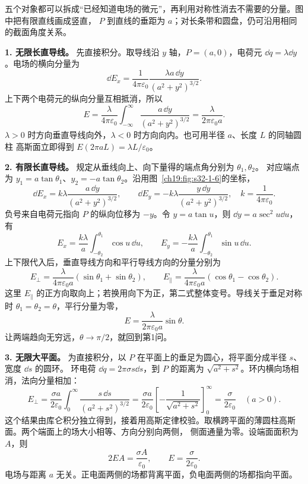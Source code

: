 \begin{xesolution}
五个对象都可以拆成“已经知道电场的微元”，再利用对称性消去不需要的分量。图中把有限直线画成竖直，
$P$ 到直线的垂距为 $a$；对长条带和圆盘，仍可沿用相同的截面角度关系。

\par\noindent\begin{minipage}{\linewidth}
\extendedChargeFigure
{}\label{ch19:fig:s32-1-6}
\end{minipage}\par\medskip

\textbf{1. 无限长直导线。} 先直接积分。取导线沿 $y$ 轴，$P=(a,0)$，电荷元
$\dd q=\lambda\dd y$。电场的横向分量为
\[
  \dd E_x=\frac{1}{4\pi\varepsilon_0}
  \frac{\lambda a\,\dd y}{(a^2+y^2)^{3/2}}.
\]
上下两个电荷元的纵向分量互相抵消，所以
\[
  E=\frac{\lambda}{4\pi\varepsilon_0}
  \int_{-\infty}^{\infty}\frac{a\,\dd y}{(a^2+y^2)^{3/2}}
  =\boxed{\frac{\lambda}{2\pi\varepsilon_0a}}.
\]
$\lambda>0$ 时方向垂直导线向外，$\lambda<0$ 时方向向内。也可用半径 $a$、长度 $L$ 的同轴圆柱
高斯面立即得到 $E(2\pi aL)=\lambda L/\varepsilon_0$。

\textbf{2. 有限长直导线。} 规定从垂线向上、向下量得的端点角分别为 $\theta_1,\theta_2$。
对应端点为 $y_1=a\tan\theta_1$、$y_2=-a\tan\theta_2$。沿用图~\ref{ch19:fig:s32-1-6}的坐标，
\[
 \dd E_x=k\lambda\frac{a\,\dd y}{(a^2+y^2)^{3/2}},\qquad
 \dd E_y=-k\lambda\frac{y\,\dd y}{(a^2+y^2)^{3/2}},\quad k=\frac1{4\pi\varepsilon_0}.
\]
负号来自电荷元指向 $P$ 的纵向位移为 $-y$。令 $y=a\tan u$，则 $\dd y=a\sec^2u\dd u$，有
\[
 E_x=\frac{k\lambda}{a}\int_{-\theta_2}^{\theta_1}\cos u\,\dd u,
 \qquad E_y=-\frac{k\lambda}{a}\int_{-\theta_2}^{\theta_1}\sin u\,\dd u.
\]
上下限代入后，垂直导线方向和平行导线方向的分量分别为
\[
  \boxed{E_\perp=\frac{\lambda}{4\pi\varepsilon_0a}
  (\sin\theta_1+\sin\theta_2)},
  \qquad
  \boxed{E_\parallel=\frac{\lambda}{4\pi\varepsilon_0a}
  (\cos\theta_1-\cos\theta_2)}.
\]
这里 $E_\parallel$ 的正方向取向上；若换用向下为正，第二式整体变号。导线关于垂足对称时
$\theta_1=\theta_2=\theta$，平行分量为零，
\[
  \boxed{E=\frac{\lambda}{2\pi\varepsilon_0a}\sin\theta}.
\]
让两端趋向无穷远，$\theta\to\pi/2$，就回到第1问。

\textbf{3. 无限大平面。} 为直接积分，以 $P$ 在平面上的垂足为圆心，将平面分成半径 $s$、宽度 $\dd s$ 的圆环。
环电荷 $\dd q=2\pi\sigma s\dd s$，到 $P$ 的距离为 $\sqrt{a^2+s^2}$。环内横向场相消，法向分量相加：
\[
 E_\perp=\frac{\sigma a}{2\varepsilon_0}\int_0^\infty
 \frac{s\,\dd s}{(a^2+s^2)^{3/2}}
 =\frac{\sigma a}{2\varepsilon_0}
 \left[-\frac1{\sqrt{a^2+s^2}}\right]_0^\infty
 =\frac{\sigma}{2\varepsilon_0}\quad(a>0).
\]
这个结果由库仑积分独立得到，接着用高斯定律校验。取横跨平面的薄圆柱高斯面。两个端面上的场大小相等、方向分别向两侧，
侧面通量为零。设端面面积为 $A$，则
\[
  2EA=\frac{\sigma A}{\varepsilon_0},
  \qquad
  \boxed{E=\frac{\sigma}{2\varepsilon_0}}.
\]
电场与距离 $a$ 无关。正电面两侧的场都背离平面，负电面两侧的场都指向平面。


\end{xesolution}
